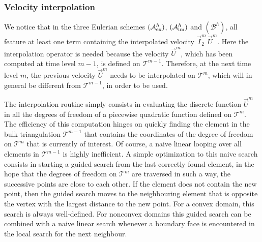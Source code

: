 \documentclass[a4paper,12pt,onecolumn]{article}
\newcommand{\schemeAex}{{\mathcal{A}^h_{\rm ex}}}
\newcommand{\schemeAim}{{\mathcal{A}^h_{\rm im}}}
\newcommand{\schemeB}{{\mathcal{B}^h}}
\begin{document}
\subsubsection{Velocity interpolation}\label{sec:velocity_interpolation}
We notice that in the three Eulerian schemes $(\schemeAex)$, $(\schemeAim)$
and $(\schemeB)$, all feature at least one term containing the
interpolated velocity $\vec I^m_2\,\vec U^m$. Here the interpolation operator
is needed because the velocity $\vec U^m$, which has been computed at time level
$m-1$, is defined on $\mathcal{T}^{m-1}$. Therefore, at the next time level
$m$, the previous velocity $\vec U^m$ needs to be interpolated on
$\mathcal{T}^m$, which will in general be different from
$\mathcal{T}^{m-1}$, in order to be used.

The interpolation routine simply consists in evaluating the discrete function
$\vec U^m$ in all the degrees of freedom of a piecewise quadratic function
defined on $\mathcal{T}^m$. The efficiency of this computation hinges on
quickly finding the element in the bulk triangulation $\mathcal{T}^{m-1}$
that contains the coordinates of the degree of freedom on $\mathcal{T}^m$
that is currently of interest. Of course, a naive linear looping over all
elements in $\mathcal{T}^{m-1}$ is highly inefficient.
A simple optimization to this naive search consists
in starting a guided search from the last correctly found element, in the hope
that the degrees of freedom on $\mathcal{T}^m$ are traversed in such a way,
the successive points are close to each other. If the element does not
contain the new point, then the guided search moves to the neighbouring
element that is opposite the vertex with the largest distance to the new
point. For a convex domain, this search is always well-defined.
For nonconvex domains this guided search
can be combined with a naive linear search whenever a boundary face is
encountered in the local search for the next neighbour.
\end{document}
